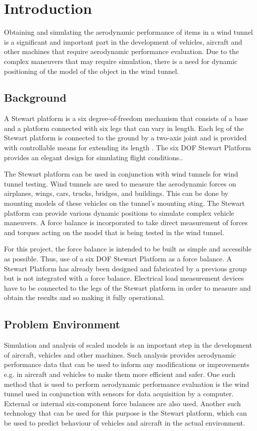 \chapter{Introduction}
\label{sec:introduction}
Obtaining and simulating the aerodynamic performance of items in a wind tunnel is a
significant and important part in the development of vehicles, aircraft and other machines
that require aerodynamic performance evaluation. Due to the complex maneuvers that
may require simulation, there is a need for dynamic positioning of the model of the object
in the wind tunnel.
\section{Background}
A Stewart platform is a six degree-of-freedom mechanism that consists of a base and a platform connected with six legs that can vary in length. Each leg of the Stewart platform is connected to the ground by a two-axis joint and is provided with controllable means for extending its length
\cite{wittenburg2016stewart}. The six DOF Stewart Platform provides an elegant design for simulating flight conditions.\cite{stewart1965platform}. 

The Stewart platform can be used in conjunction with wind tunnels for wind tunnel testing. Wind tunnels are used to measure the aerodynamic forces on airplanes, wings, cars, trucks, bridges, and buildings. This can be done by mounting models of these vehicles on the tunnel's mounting sting. The Stewart platform can provide various dynamic positions to simulate complex vehicle maneuvers. A force balance is incorporated to take direct measurement of forces and torques acting on the model that is being tested in the wind tunnel.

For this project, the force balance is intended to be built as simple and accessible as possible. Thus, use of a six DOF Stewart Platform as a force balance. A Stewart Platform has already been designed and fabricated by a previous group but is not integrated with a force balance. Electrical load measurement devices have to be connected to the legs of the Stewart platform in order to measure and obtain the results and so making it fully operational.

\section{Problem Environment}
Simulation and analysis of scaled models is an important step in the development of aircraft, vehicles and other machines. Such analysis provides aerodynamic performance data that can be used to inform any modifications or improvements e.g. in aircraft and vehicles to make them more efficient and safer. One such method that is used to perform aerodynamic performance evaluation is the wind tunnel used in conjunction with sensors for data acquisition by a computer. External or internal six-component force balances are also used. Another such technology that can be used for this purpose is the Stewart platform, which can be used to predict behaviour of vehicles and aircraft in the actual environment.

